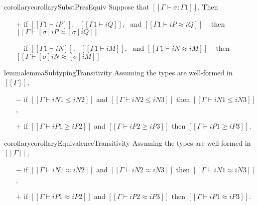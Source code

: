 \begin{restatable}{corollary}{corollarySubstPresEquiv}
    \label{corollary:subst-pres-equiv}
    Suppose that $[[Γ ⊢ σ : Γ1]]$. Then
        \begin{itemize}
            \item[$+$] if $[[Γ1 ⊢ iP]]$,~ $[[Γ1 ⊢ iQ]]$,~ and $[[Γ1 ⊢ iP ≈ iQ]]$ ~ 
                then $[[Γ ⊢ [σ]iP ≈ [σ]iQ]]$
            \item[$-$] if $[[Γ1 ⊢ iN]]$,~ $[[Γ1 ⊢ iM]]$,~ and $[[Γ1 ⊢ iN ≈ iM]]$ ~ 
                then $[[Γ ⊢ [σ]iN ≈ [σ]iM]]$
        \end{itemize}
\end{restatable}

\begin{restatable}{lemma}{lemmaSubtypingTransitivity}
        \label{lemma:subtyping-transitivity}
        Assuming the types are well-formed in $[[Γ]]$,
        \begin{itemize}
            \item[$-$] if $[[Γ ⊢ iN1 ≤ iN2]]$ and $[[Γ ⊢ iN2 ≤ iN3]]$ then $[[Γ ⊢ iN1 ≤ iN3]]$,
            \item[$+$] if $[[Γ ⊢ iP1 ≥ iP2]]$ and $[[Γ ⊢ iP2 ≥ iP3]]$ then $[[Γ ⊢ iP1 ≥ iP3]]$.
        \end{itemize}
\end{restatable}

\begin{restatable}{corollary}{corollaryEquivalenceTransitivity}
    \label{corollary:equivalence-transitivity}
    Assuming the types are well-formed in $[[Γ]]$,
    \begin{itemize}
        \item[$-$] if $[[Γ ⊢ iN1 ≈ iN2]]$ and $[[Γ ⊢ iN2 ≈ iN3]]$ then $[[Γ ⊢ iN1 ≈ iN3]]$,
        \item[$+$] if $[[Γ ⊢ iP1 ≈ iP2]]$ and $[[Γ ⊢ iP2 ≈ iP3]]$ then $[[Γ ⊢ iP1 ≈ iP3]]$.
    \end{itemize}
\end{restatable}
